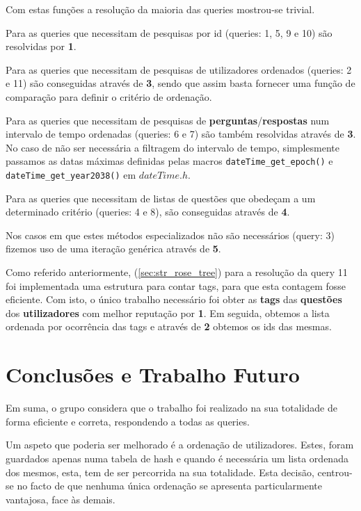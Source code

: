 \documentclass[10pt,a4paper]{article}
\begin{document}
    Com estas funções a resolução da maioria das queries mostrou-se
    trivial.

    Para as queries que necessitam de pesquisas por id (queries: 1, 5, 9 e 10)
    são resolvidas por \textbf{1}.

    Para as queries que necessitam de pesquisas de utilizadores ordenados
    (queries: 2 e 11) são conseguidas através de \textbf{3}, sendo que assim
    basta fornecer uma função de comparação para definir o critério de ordenação.

    Para as queries que necessitam de pesquisas de
    \textbf{perguntas}/\textbf{respostas} num intervalo de tempo ordenadas
    (queries: 6 e 7) são também resolvidas através de \textbf{3}. No caso de não
    ser necessária a filtragem do intervalo de tempo, simplesmente passamos as
    datas máximas definidas pelas macros \texttt{dateTime_get_epoch()} e
    \texttt{dateTime_get_year2038()} em $dateTime.h$.

    Para as queries que necessitam de listas de questões que obedeçam a um
    determinado critério (queries: 4 e 8), são conseguidas através de \textbf{4}.

    Nos casos em que estes métodos especializados não são necessários (query: 3)
    fizemos uso de uma iteração genérica através de \textbf{5}.

    Como referido anteriormente, (\ref{sec:str_rose_tree}) para a resolução da
    query 11 foi implementada uma estrutura para contar tags, para que esta
    contagem fosse eficiente. Com isto, o único trabalho necessário foi obter as
    \textbf{tags} das \textbf{questões} dos \textbf{utilizadores} com melhor
    reputação por \textbf{1}. Em seguida, obtemos a lista ordenada por ocorrência
    das tags e através de \textbf{2} obtemos os ids das mesmas.

\section{Conclusões e Trabalho Futuro}
    Em suma, o grupo considera que o trabalho foi realizado na sua
    totalidade de forma eficiente e correta, respondendo a todas as queries.

    Um aspeto que poderia ser melhorado é a ordenação de utilizadores. Estes,
    foram guardados apenas numa tabela de hash e quando é necessária um lista
    ordenada dos mesmos, esta, tem de ser percorrida na sua totalidade. Esta
    decisão, centrou-se no facto de que nenhuma única ordenação se apresenta
    particularmente vantajosa, face às demais.
\end{document}
